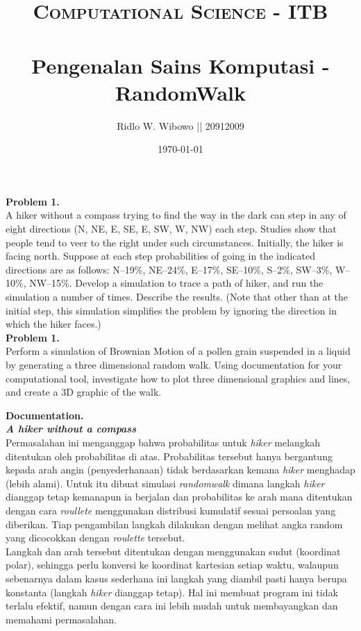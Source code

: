 \documentclass[paper=a4, fontsize=11pt]{scrartcl}
\title{	
\normalfont \normalsize 
\textsc{Computational Science - ITB} \\ [25pt] %
\horrule{0.5pt} \\[0.4cm] %
\small  Pengenalan Sains Komputasi - RandomWalk\\ %
}
\author{\small{Ridlo W. Wibowo || 20912009}} %
\date{\normalsize\today} %
\numberwithin{equation}{section} %
\numberwithin{figure}{section} %
\numberwithin{table}{section} %
\begin{document}
\maketitle %

\large \textbf{Problem 1.}\\
A hiker without a compass trying to find the way in the dark can step in any of eight directions (N, NE, E, SE, E, SW, W, NW) each step. Studies show that people tend to veer to the right under such circumstances. Initially, the hiker is facing north. Suppose at each step probabilities of going in the indicated directions are as follows: N\---19\%, NE\---24\%, E\---17\%, SE\---10\%, S\---2\%, SW\---3\%, W\---10\%, NW\---15\%. Develop a simulation to trace a path of hiker, and run the simulation a number of times. Describe the results. (Note that other than at the initial step, this simulation simplifies the problem by ignoring the direction in which the hiker faces.)\\

\large \textbf{Problem 1.}\\
Perform a simulation of Brownian Motion of a pollen grain suspended in a liquid by generating a three dimensional random walk. Using documentation for your computational tool, investigate how to plot three dimensional graphics and lines, and create a 3D graphic of the walk.


\vspace{2cm}
\large \textbf{Documentation.}\\
\textit{\textbf{A hiker without a compass}}\\
Permasalahan ini menganggap bahwa probabilitas untuk \textit{hiker} melangkah ditentukan oleh probabilitas di atas. Probabilitas tersebut hanya bergantung kepada arah angin (penyederhanaan) tidak berdasarkan kemana \textit{hiker} menghadap (lebih alami). Untuk itu dibuat simulasi \textit{randomwalk} dimana langkah \textit{hiker} dianggap tetap kemanapun ia berjalan dan probabilitas ke arah mana ditentukan dengan cara \textit{roullete} menggunakan distribusi kumulatif sesuai persoalan yang diberikan. Tiap pengambilan langkah dilakukan dengan melihat angka random yang dicocokkan dengan \textit{roulette} tersebut. \\

Langkah dan arah tersebut ditentukan dengan menggunakan sudut (koordinat polar), sehingga perlu konversi ke koordinat kartesian setiap waktu, walaupun sebenarnya dalam kasus sederhana ini langkah yang diambil pasti hanya berupa konstanta (langkah \textit{hiker} dianggap tetap). Hal ini membuat program ini tidak terlalu efektif, namun dengan cara ini lebih mudah untuk membayangkan dan memahami permasalahan.\\
\end{document}
